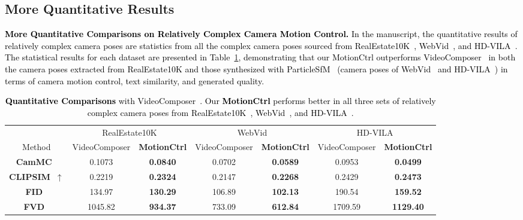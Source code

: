\documentclass[sigconf]{acmart}
\begin{document}
\subsection{More Quantitative Results}

\textcolor{black}{
\noindent\textbf{More Quantitative Comparisons on Relatively Complex Camera Motion Control.} In the manuscript, the quantitative results of relatively complex camera poses are statistics from all the complex camera poses sourced from RealEstate10K~\cite{zhou2018stereo}, WebVid~\cite{bain2021frozen}, and HD-VILA~\cite{xue2022advancing}. The statistical results for each dataset are presented in Table~\ref{tab:detail_complex}, demonstrating that our MotionCtrl outperforms VideoComposer~\cite{wang2023videocomposer} in both the camera poses extracted from RealEstate10K and those synthesized with ParticleSfM~\cite{zhao2022particlesfm} (camera poses of WebVid~\cite{bain2021frozen} and HD-VILA~\cite{xue2022advancing}) in terms of camera motion control, text similarity, and generated quality.
}

\begin{table}[th]
  \caption{\textcolor{black}{\textbf{Quantitative Comparisons} with VideoComposer~\cite{wang2023videocomposer}. Our \textbf{MotionCtrl} performs better in all three sets of relatively complex camera poses from RealEstate10K~\cite{zhou2018stereo}, WebVid~\cite{bain2021frozen}, and HD-VILA~\cite{xue2022advancing}.}}
  \centering
  \begin{tabular}{c|cc|cc|cc}
    \toprule
    & \multicolumn{2}{|c|}{RealEstate10K} & \multicolumn{2}{c|}{WebVid} & \multicolumn{2}{c}{HD-VILA} \\ 
    Method & VideoComposer & \textbf{MotionCtrl} & VideoComposer & \textbf{MotionCtrl} & VideoComposer & \textbf{MotionCtrl} \\
    \midrule
    \textbf{CamMC~}  & 0.1073  & \textbf{0.0840} & 0.0702  & \textbf{0.0589} & 0.0953  & \textbf{0.0499}\\
    \textbf{CLIPSIM~$\uparrow$}  & 0.2219  & \textbf{0.2324} & 0.2147  & \textbf{0.2268} & 0.2429  & \textbf{0.2473}\\
    \textbf{FID~}    & 134.97  & \textbf{130.29} & 106.89  & \textbf{102.13} & 190.54  & \textbf{159.52}\\
    \textbf{FVD~}    & 1045.82 & \textbf{934.37} & 733.09 & \textbf{612.84} & 1709.59 & \textbf{1129.40}\\
    \bottomrule
  \end{tabular}
  \label{tab:detail_complex}
\end{table}
\end{document}
